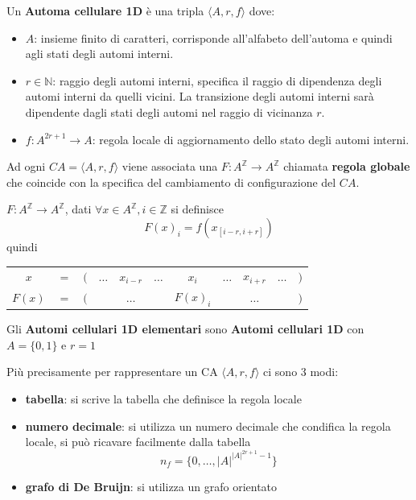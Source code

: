 \begin{definizione} 
    Un \textbf{Automa cellulare 1D}  è una tripla $\langle A, r, f\rangle$
    dove:
    \begin{itemize}
        \item $A$: insieme finito di caratteri, corrisponde all'alfabeto dell'automa e
              quindi agli stati degli automi interni.
        \item $r\in \mathbb{N}$: raggio degli automi interni, specifica il raggio
              di dipendenza degli automi interni da quelli vicini. La transizione degli
              automi interni sarà dipendente dagli stati degli automi nel raggio
              di vicinanza $r$.
        \item $f: A^{2r+1}\rightarrow A$: regola locale di aggiornamento dello
              stato degli automi interni.
    \end{itemize}
\end{definizione}
Ad ogni $CA = \langle A, r, f\rangle$ viene associata una $F:A^\mathbb{Z}\rightarrow A^\mathbb{Z}$
chiamata \textbf{regola globale} che coincide con la specifica del cambiamento
di configurazione del $CA$.
\begin{definizione} 
    $F:A^\mathbb{Z}\rightarrow A^\mathbb{Z}$, dati $\forall x \in A^\mathbb{Z}, i \in \mathbb{Z}$
    si definisce
    $$F(x)_i = f(x_{[i-r, i+r]})$$
    quindi
    \begin{table}[!h]
        \centering
        \begin{tabular}{ccccccccccc}
            $x$    & $=$ & $($ & $\dots$                     & $x_{i-r}$ & $\dots$                     & $x_i$ & $\dots$ & $x_{i+r}$ & $\dots$ & $)$ \\
            $F(x)$ & $=$ & $($ & \multicolumn{3}{c}{$\dots$} & $F(x)_i$  & \multicolumn{3}{c}{$\dots$} & $)$
        \end{tabular}
    \end{table}
\end{definizione}
\begin{definizione} 
    Gli \textbf{Automi cellulari 1D elementari} sono \textbf{Automi cellulari 1D}
    con $A=\{0,1\}$ e $r=1$
\end{definizione}

Più precisamente per rappresentare un CA  $\langle A, r, f\rangle$ ci sono 3 modi:
\begin{itemize}
    \item \textbf{tabella}: si scrive la tabella che definisce la regola locale
    \item \textbf{numero decimale}: si utilizza un numero decimale che condifica
          la regola locale, si può ricavare facilmente dalla tabella
          $$n_f = \{0,\dots, |A|^{|A|^{2r+1}-1}\}$$
    \item \textbf{grafo di De Bruijn}: si utilizza un grafo orientato
\end{itemize}


